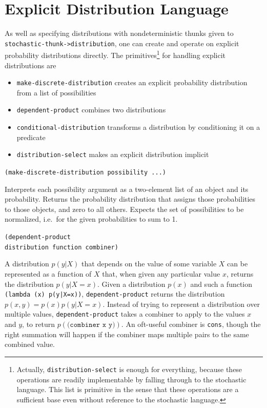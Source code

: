 \documentclass[10pt]{sigplanconf}
\newcommand{\code}[1]{\texttt{#1}}
\newenvironment{documentation}[1]{\vspace{5pt} \noindent \texttt{#1} \nopagebreak \begin{list}{}{\leftmargin 0.7cm}\item}{\end{list}}
\begin{document}
\section{Explicit Distribution Language}
\label{explicit}

As well as specifying distributions with nondeterministic thunks given
to \code{stochastic-thunk->distribution}, one can create and operate
on explicit probability distributions directly.  The
primitives\footnote{Actually, \code{distribution-select} is enough for
everything, because these operations are readily implementable by
falling through to the stochastic language.  This list is primitive in
the sense that these operations are a sufficient base even without
reference to the stochastic language.} for handling explicit
distributions are
\begin{itemize}
\item \code{make-discrete-distribution} creates an explicit probability
distribution from a list of possibilities
\item \code{dependent-product} combines two distributions
\item \code{conditional-distribution} transforms a distribution
by conditioning it on a predicate
\item \code{distribution-select} makes an explicit distribution
implicit
\end{itemize}

\begin{documentation}{(make-discrete-distribution possibility ...)}
Interprets each possibility argument as a two-element list of an object
and its probability.  Returns the probability distribution that assigns
those probabilities to those objects, and zero to all others.
Expects the set of possibilities to be normalized, i.e.\ for the
given probabilities to sum to 1.
\end{documentation}

\begin{documentation}{(dependent-product \\ \mbox{} distribution function combiner)}
A distribution $p(y|X)$ that depends on the value of some variable
$X$ can be represented as a function of $X$ that, when given any
particular value $x$, returns the distribution $p(y|X=x)$.  Given a
distribution $p(x)$ and such a function \code{(lambda (x)
p(y|X=x))}, \code{dependent-product} returns the distribution
$p(x,y) = p(x)p(y|X=x)$.  Instead of
trying to represent a distribution over multiple values,
\code{dependent-product} takes a combiner to apply to the values $x$
and $y$, to return $p(\code{(combiner x y)})$.  An oft-useful
combiner is \code{cons}, though the right summation will happen
if the combiner maps multiple pairs to the same combined value.
\end{documentation}
\end{document}

